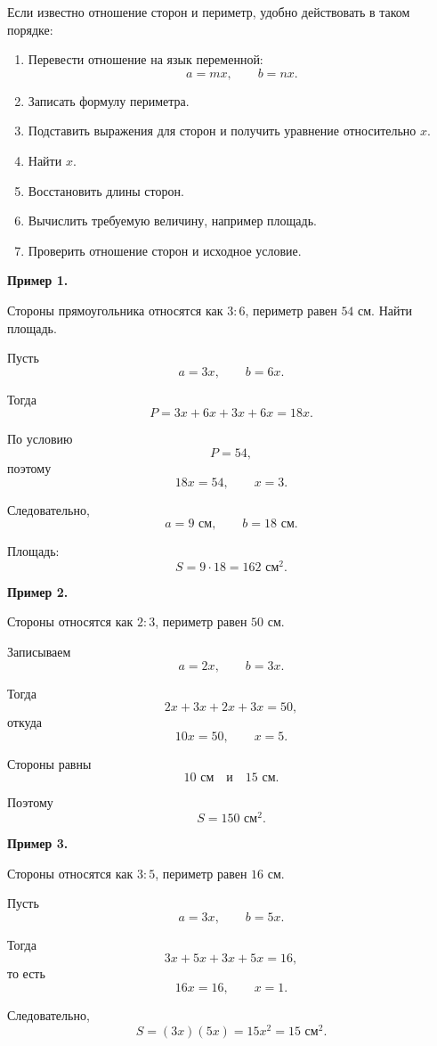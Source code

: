 \documentclass[a4paper,12pt]{article}
\begin{document}
Если известно отношение сторон и периметр, удобно действовать в таком порядке:

\begin{enumerate}
  \item Перевести отношение на язык переменной:
  \[
  a=mx,
  \qquad
  b=nx.
  \]

  \item Записать формулу периметра.

  \item Подставить выражения для сторон и получить уравнение относительно $x$.

  \item Найти $x$.

  \item Восстановить длины сторон.

  \item Вычислить требуемую величину, например площадь.

  \item Проверить отношение сторон и исходное условие.
\end{enumerate}

\begin{examplebox}
\textbf{Пример 1.}

Стороны прямоугольника относятся как $3:6$, периметр равен $54$ см. Найти площадь.

Пусть
\[
a=3x,
\qquad
b=6x.
\]

Тогда
\[
P=3x+6x+3x+6x=18x.
\]

По условию
\[
P=54,
\]
поэтому
\[
18x=54,
\qquad
x=3.
\]

Следовательно,
\[
a=9\text{ см},
\qquad
b=18\text{ см}.
\]

Площадь:
\[
S=9\cdot18=162\text{ см}^2.
\]
\end{examplebox}

\begin{examplebox}
\textbf{Пример 2.}

Стороны относятся как $2:3$, периметр равен $50$ см.

Записываем
\[
a=2x,
\qquad
b=3x.
\]

Тогда
\[
2x+3x+2x+3x=50,
\]
откуда
\[
10x=50,
\qquad
x=5.
\]

Стороны равны
\[
10\text{ см}
\quad\text{и}\quad
15\text{ см}.
\]

Поэтому
\[
S=150\text{ см}^2.
\]
\end{examplebox}

\begin{examplebox}
\textbf{Пример 3.}

Стороны относятся как $3:5$, периметр равен $16$ см.

Пусть
\[
a=3x,
\qquad
b=5x.
\]

Тогда
\[
3x+5x+3x+5x=16,
\]
то есть
\[
16x=16,
\qquad
x=1.
\]

Следовательно,
\[
S=(3x)(5x)=15x^2=15\text{ см}^2.
\]
\end{examplebox}
\end{document}
